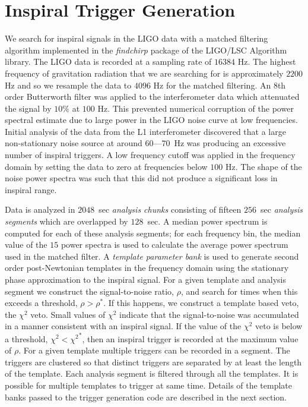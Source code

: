 
\section{Inspiral Trigger Generation}
\label{s:trigger}

We search for inspiral signals in the LIGO data with a matched
filtering\cite{wz} algorithm implemented in the \emph{findchirp}
package\cite{findchirp} of the LIGO/LSC Algorithm library\cite{lal}. The LIGO
data is recorded at a sampling rate of $16384$ Hz.  The highest frequency of
gravitation radiation that we are searching for is approximately $2200$ Hz and
so we resample the data to $4096$ Hz for the matched filtering.  An 8th order
Butterworth filter was applied to the interferometer data which attenuated the
signal by $10\%$ at $100$ Hz. This prevented numerical corruption of the power
spectral estimate due to large power in the LIGO noise curve at low
frequencies. Initial analysis of the data from the L1 interferometer
discovered that a large non-stationary noise source at around $60$---$70$~Hz
was producing an excessive number of inspiral triggers. A low frequency cutoff
was applied in the frequency domain by setting the data to zero at frequencies
below $100$ Hz.  The shape of the noise power spectra was such that this did
not produce a significant loss in inspiral range. 

Data is analyzed in $2048$~sec \emph{analysis chunks} consisting of fifteen
$256$~sec \emph{analysis segments} which are overlapped by $128$~sec. A median
power spectrum is computed for each of these analysis segments; for each
frequency bin, the median value of the $15$ power spectra is used to
calculate the average power spectrum used in the matched filter.  A
\emph{template parameter bank} is used to generate second order post-Newtonian
templates in the frequency domain using the stationary phase approximation to
the inspiral signal. For a given template
and analysis segment we construct the signal-to-noise ratio, $\rho$,  and
search for times when this exceeds a threshold,  $\rho > \rho^\ast$. If this
happens, we construct a template based veto, the $\chi^2$
veto\cite{brucechisq}. Small values of $\chi^2$ indicate that the
signal-to-noise was accumulated in a manner consistent with an inspiral
signal. If the value of the $\chi^2$ veto is below a threshold, $\chi^2 <
{\chi^2}^\ast$, then an inspiral trigger is recorded at the maximum value of
$\rho$. For a given template multiple triggers can be recorded in a segment.
The triggers are clustered so that distinct triggers are separated by at least
the length of the template.  Each analysis segment is filtered through all the
templates. It is possible for multiple templates to trigger at same time.
Details of the template banks passed to the trigger generation code are
described in the next section. 

